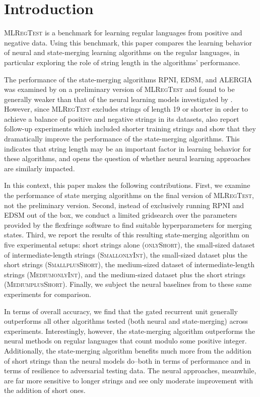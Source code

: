 \documentclass[twoside,11pt]{article}
\newcommand{\tscx}[1]{\textsc{#1}\xspace}
\newcommand{\sm}{\tscx{Small}}
\newcommand{\med}{\tscx{Medium}}
\newcommand{\onlyShort}{\tscx{onlyShort}}
\newcommand{\plusShort}{\tscx{plusShort}}
\newcommand{\onlyInt}{\tscx{onlyInt}}
\begin{document}
\section{Introduction}


\textsc{MLRegTest} \citep{mlregtest} is a benchmark for learning regular languages from positive and negative data.
Using this benchmark, this paper compares the learning behavior of neural and state-merging learning algorithms on the regular languages, in particular exploring the role of string length in the algorithms' performance.
  
The performance of the state-merging algorithms RPNI, EDSM, and ALERGIA was examined by \citet{adil23} on a preliminary version of \textsc{MLRegTest} and found to be generally weaker than that of the neural learning models investigated by \citet{mlregtest}.
However, since \textsc{MLRegTest} excludes strings of length 19 or shorter in order to achieve a balance of positive and negative strings in its datasets, \citet{adil23} also report follow-up experiments which included shorter training strings and show that they dramatically improve the performance of the state-merging algorithms.
This indicates that string length may be an important factor in learning behavior for these algorithms, and opens the question of whether neural learning approaches are similarly impacted.
  
  In this context, this paper makes the following
  contributions. 
  First, we examine the performance of state merging algorithms on the final version of \textsc{MLRegTest}, not the preliminary version.
  Second, instead of exclusively running RPNI and EDSM out of the box, we conduct a limited gridsearch over the parameters provided
  by the flexfringe software \citep{flexfringe-short, flexfringe} to
  find suitable hyperparameters for merging states.
  Third, we report the results of this resulting state-merging algorithm on five experimental setups: short strings alone (\onlyShort), the small-sized dataset of intermediate-length strings (\sm \onlyInt), the small-sized dataset plus the short strings (\sm \plusShort), the medium-sized dataset of intermediate-length strings (\med \onlyInt), and the medium-sized dataset plus the short strings (\med \plusShort).
  Finally, we subject
  the neural baselines from \citet{mlregtest} to these same
  experiments for comparison.

In terms of overall accuracy, we find that the gated recurrent unit generally outperforms all other algorithms tested (both neural and state-merging) across experiments.
Interestingly, however, the state-merging algorithm outperforms the neural methods on regular languages that count modulo some positive integer. 
Additionally, the state-merging algorithm benefits much more from the addition of short strings than the neural models do--both in terms of performance and in terms of resilience to adversarial testing data.
The neural approaches, meanwhile, are far more sensitive to longer strings and see only moderate improvement with the addition of short ones. 
\end{document}

